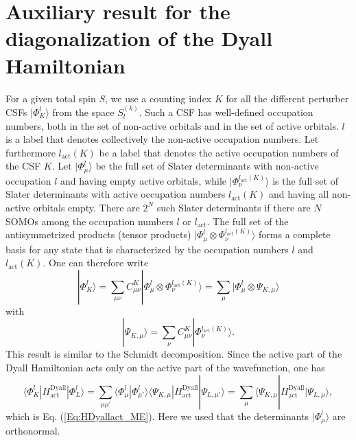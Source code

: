 \section{Auxiliary result for the diagonalization of the Dyall Hamiltonian}
\label{Ap:DiagDyallAux}
For a given total spin $S$, we use a counting index $K$ for all the different perturber CSFs $|\Phi^l_{K}\rangle$ from the space $S_l^{(k)}$. Such a CSF has well-defined occupation numbers, both in the set of non-active orbitals and in the set of active orbitals. $l$ is a label that denotes collectively the non-active occupation numbers. Let furthermore $l_\text{act}(K)$ be a label that denotes the active occupation numbers of the CSF $K$. Let $|\Phi_\mu^l\rangle$ be the full set of Slater determinants with non-active occupation $l$ and having empty active orbitals, while $|\Phi_\nu^{l_\text{act}(K)}\rangle$ is the full set of Slater determinants with active occupation numbers $l_\text{act}(K)$ and having all non-active orbitals empty. There are $2^N$ such Slater determinants if there are $N$ SOMOs among the occupation numbers $l$ or $l_\text{act}$. The full set of the antisymmetrized products (tensor products) $|\Phi_\mu^l\otimes\Phi_\nu^{l_\text{act}(K)}\rangle$ forms a complete basis for any state that is characterized by the occupation numbers $l$ and $l_\text{act}(K)$. One can therefore write
\begin{equation}
\label{Eq:expansion_CSF}
|\Phi^l_{K}\rangle = \sum_{\mu\nu} C_{\mu\nu}^K |\Phi_\mu^l \otimes \Phi_\nu^{l_\text{act}(K)}\rangle = \sum_\mu |\Phi_\mu^l \otimes \Psi_{K, \mu}\rangle
\end{equation}
with
\begin{equation}
|\Psi_{K, \mu}\rangle = \sum_\nu C_{\mu\nu}^K |\Phi_\nu^{l_\text{act}(K)}\rangle.
\end{equation}
This result is similar to the Schmidt decomposition.
Since the active part of the Dyall Hamiltonian acts only on the active part of the wavefunction, one has
\begin{equation}
\langle \Phi^l_K | H_\text{act}^\text{Dyall}|\Phi^l_L\rangle = \sum_{\mu\mu'} \langle \Phi^l_\mu | \Phi^l_{\mu'}\rangle \langle \Psi_{K,\mu} | H_\text{act}^\text{Dyall}|\Psi_{L,\mu'}\rangle = \sum_\mu \langle \Psi_{K,\mu} | H_\text{act}^\text{Dyall}|\Psi_{L,\mu}\rangle,
\end{equation}
which is Eq. (\ref{Eq:HDyallact_ME}).
Here we used that the determinants $|\Phi_\mu^l\rangle$ are orthonormal.
